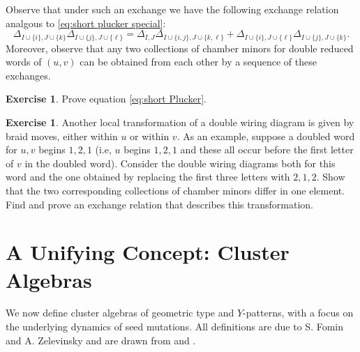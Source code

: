 \documentclass{amsart}
\theoremstyle{definition}
\newtheorem{example}[theorem]{Example}
\newtheorem{exercise}[theorem]{Exercise}
\theoremstyle{remark}
\numberwithin{equation}{section}
\begin{document}
    Observe that under such an exchange we have the following exchange relation analgous to \eqref{eq:short plucker special}:
    \begin{equation}\label{eq:short Plucker}
      \Delta_{I\cup\{i\},J\cup\{k\}}\Delta_{I\cup\{j\},J\cup\{\ell\}}=\Delta_{I,J}\Delta_{I\cup\{i,j\},J\cup\{k,\ell\}}+\Delta_{I\cup\{i\},J\cup\{\ell\}}\Delta_{I\cup\{j\},J\cup\{k\}}.
    \end{equation}
    Moreover, observe that any two collections of chamber minors for double reduced words of $(u,v)$ can be obtained from each other by a sequence of these exchanges.
    \begin{exercise}
      Prove equation \eqref{eq:short Plucker}.
    \end{exercise}
		
		\begin{exercise}
		Another local transformation of a double wiring diagram is given by braid moves, either within $u$ or within $v$.  As an example, suppose a doubled word for $u,v$ begins $1,2,1$ (i.e, $u$ begins $1,2,1$ and these all occur before the first letter of $v$ in the doubled word).  Consider the double wiring diagrams both for this word and the one obtained by replacing the first three letters with $2,1,2$.  Show that the two corresponding collections of chamber minors differ in one element.  Find and prove an exchange relation that describes this transformation.
		\end{exercise}



\section{A Unifying Concept: Cluster Algebras}\label{sec:cluster_algebras}
	We now define cluster algebras of geometric type and $Y$-patterns, with a focus on the underlying dynamics of seed mutations. All definitions are due to S. Fomin and A. Zelevinsky and are drawn from \cite{FZ02} and \cite{FZ07}.
	
\end{document}
